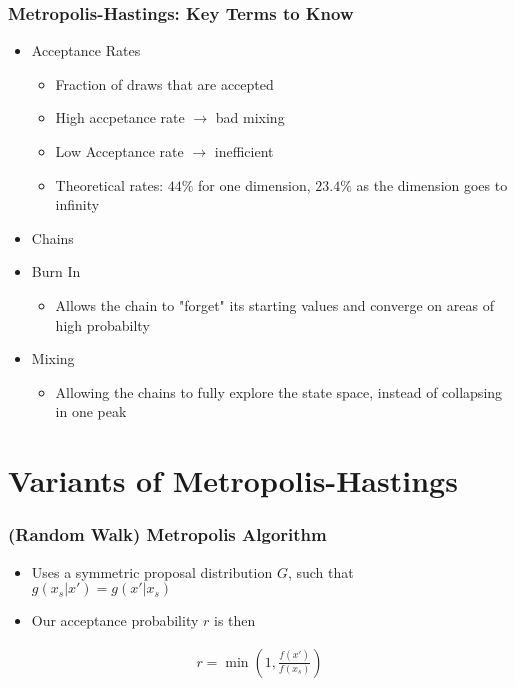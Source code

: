 \documentclass{beamer}
\begin{document}
\begin{frame}
\frametitle{Metropolis-Hastings: Key Terms to Know}
\begin{itemize}
  \item Acceptance Rates
  \begin{itemize}
    \item Fraction of draws that are accepted
    \item High accpetance rate $\rightarrow$ bad mixing
    \item Low Acceptance rate $\rightarrow$ inefficient
    \item Theoretical rates: $44\%$ for one dimension, $23.4\%$ as the dimension goes to infinity
  \end{itemize}
  \item Chains
  \item Burn In
  \begin{itemize}
    \item Allows the chain to "forget" its starting values and converge on areas of high probabilty
  \end{itemize}
  \item Mixing
  \begin{itemize}
    \item Allowing the chains to fully explore the state space, instead of collapsing
    in one peak
  \end{itemize}
\end{itemize}
\end{frame}



\section{Variants of Metropolis-Hastings}
\begin{frame}
  \frametitle{(Random Walk) Metropolis Algorithm}
  \begin{itemize}
    \item Uses a symmetric proposal distribution $G$, such that \\
    $g(x_s|x') = g(x'|x_s)$
    \item Our acceptance probability $r$ is then
  \end{itemize}
  \begin{gather*}
    r = \min \left(1 , \frac{f(x')}{f(x_s)} \right)
  \end{gather*}
\end{frame}
\end{document}
